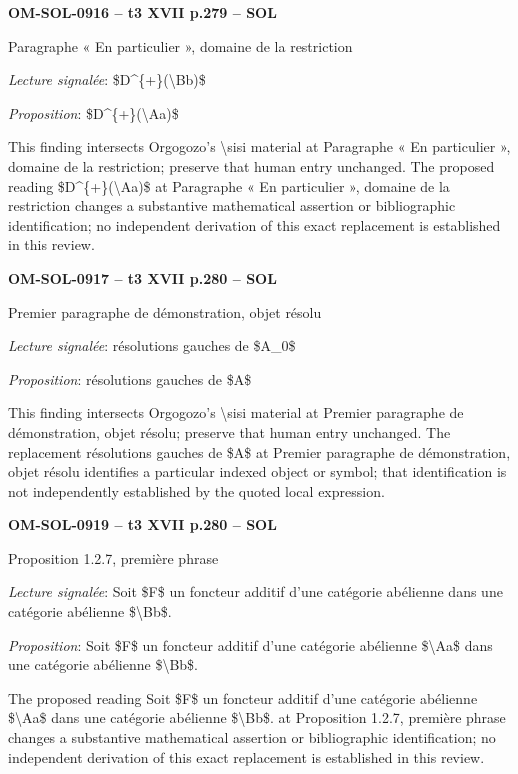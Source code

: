 \par\noindent\textbf{OM-SOL-0916 -- t3 XVII p.279 -- SOL}\par
Paragraphe « En particulier », domaine de la restriction\par
\emph{Lecture signalée}: \$D\textasciicircum{}\{+\}(\textbackslash{}Bb)\$\par
\emph{Proposition}: \$D\textasciicircum{}\{+\}(\textbackslash{}Aa)\$\par
This finding intersects Orgogozo's \textbackslash{}sisi material at Paragraphe « En particulier », domaine de la restriction; preserve that human entry unchanged. The proposed reading \$D\textasciicircum{}\{+\}(\textbackslash{}Aa)\$ at Paragraphe « En particulier », domaine de la restriction changes a substantive mathematical assertion or bibliographic identification; no independent derivation of this exact replacement is established in this review.\par
\par\noindent\textbf{OM-SOL-0917 -- t3 XVII p.280 -- SOL}\par
Premier paragraphe de démonstration, objet résolu\par
\emph{Lecture signalée}: résolutions gauches de \$A\_0\$\par
\emph{Proposition}: résolutions gauches de \$A\$\par
This finding intersects Orgogozo's \textbackslash{}sisi material at Premier paragraphe de démonstration, objet résolu; preserve that human entry unchanged. The replacement résolutions gauches de \$A\$ at Premier paragraphe de démonstration, objet résolu identifies a particular indexed object or symbol; that identification is not independently established by the quoted local expression.\par
\par\noindent\textbf{OM-SOL-0919 -- t3 XVII p.280 -- SOL}\par
Proposition 1.2.7, première phrase\par
\emph{Lecture signalée}: Soit \$F\$ un foncteur additif d'une catégorie abélienne dans une catégorie abélienne \$\textbackslash{}Bb\$.\par
\emph{Proposition}: Soit \$F\$ un foncteur additif d'une catégorie abélienne \$\textbackslash{}Aa\$ dans une catégorie abélienne \$\textbackslash{}Bb\$.\par
The proposed reading Soit \$F\$ un foncteur additif d'une catégorie abélienne \$\textbackslash{}Aa\$ dans une catégorie abélienne \$\textbackslash{}Bb\$. at Proposition 1.2.7, première phrase changes a substantive mathematical assertion or bibliographic identification; no independent derivation of this exact replacement is established in this review.\par
